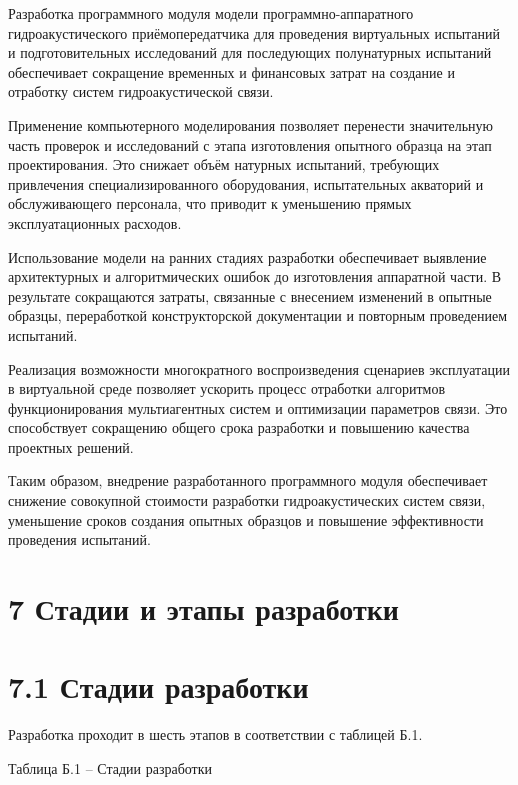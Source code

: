 Разработка программного модуля модели программно-аппаратного
гидроакустического приёмопередатчика для проведения виртуальных
испытаний и подготовительных исследований для последующих полунатурных
испытаний обеспечивает сокращение временных и финансовых затрат на
создание и отработку систем гидроакустической связи.

Применение компьютерного моделирования позволяет перенести значительную
часть проверок и исследований с этапа изготовления опытного образца на
этап проектирования. Это снижает объём натурных испытаний, требующих
привлечения специализированного оборудования, испытательных акваторий и
обслуживающего персонала, что приводит к уменьшению прямых
эксплуатационных расходов.

Использование модели на ранних стадиях разработки обеспечивает выявление
архитектурных и алгоритмических ошибок до изготовления аппаратной части.
В результате сокращаются затраты, связанные с внесением изменений в
опытные образцы, переработкой конструкторской документации и повторным
проведением испытаний.

Реализация возможности многократного воспроизведения сценариев
эксплуатации в виртуальной среде позволяет ускорить процесс отработки
алгоритмов функционирования мультиагентных систем и оптимизации
параметров связи. Это способствует сокращению общего срока разработки и
повышению качества проектных решений.

Таким образом, внедрение разработанного программного модуля обеспечивает
снижение совокупной стоимости разработки гидроакустических систем связи,
уменьшение сроков создания опытных образцов и повышение эффективности
проведения испытаний.

\section{7 Стадии и этапы
разработки}\label{ux441ux442ux430ux434ux438ux438-ux438-ux44dux442ux430ux43fux44b-ux440ux430ux437ux440ux430ux431ux43eux442ux43aux438}

\section{7.1 Стадии
разработки}\label{ux441ux442ux430ux434ux438ux438-ux440ux430ux437ux440ux430ux431ux43eux442ux43aux438}

Разработка проходит в шесть этапов в соответствии с таблицей Б.1.

Таблица Б.1 -- Стадии разработки

